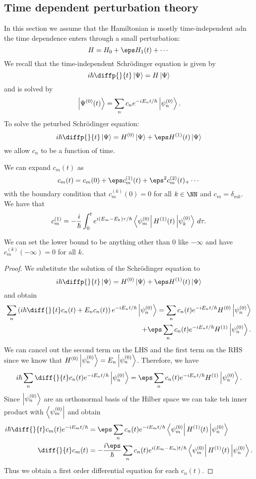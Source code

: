 \documentclass[12pt, a4paper]{article}
\begin{document}
\subsection{Time dependent perturbation theory}

In this section we assume that the Hamiltonian is mostly time-independent adn the time dependence enters through a small perturbation:
\[H=H_0 +\eps H_1(t)+\cdots\]
We recall that the time-independent Schrödinger equation is given by 
\[i\hbar \diffp{}{t}\ket{\Psi} = H\ket{\Psi}\]
and is solved by 
\[\ket{\Psi^{(0)}(t)} = \sum_n c_n e^{-i E_n t/\hbar} \ket{\psi_n^{(0)}}.\]
To solve the peturbed Schrödinger equation:
\[i\hbar \diffp{}{t} \ket{\Psi} = H^{(0)} \ket{\Psi} +\eps H^{(1)}(t)\ket{\Psi}\]
we allow \(c_n\) to be a function of time.

\begin{mdprop}
    We can expand \(c_m(t)\) as 
    \[c_m(t) = c_m(0)+\eps c_m^{(1)}(t) +\eps^2 c_m^{(2)}(t) _
    +\cdots\]
    with the boundary condition that \(c_m^{(k)}(0)=0\) for all \(k \in \NN\) and \(c_m = \delta_{mk}\). We have that 
    \[c_m^{(1)} = -\frac{i}{\hbar} \int_0^t e^{i(E_m-E_k)\tau/\hbar} \bra{\psi_m^{(0)}} H^{(1)}(t) \ket{\psi_k^{(0)}} \, d\tau.\]
\end{mdprop}

\begin{mdnote}
    We can set the lower bound to be anything other than \(0\) like \(-\infty\) and have \(c_m^{(k)}(-\infty)=0\) for all \(k\). 
\end{mdnote}

\begin{proof}
    We substitute the solution of the Schrödinger equation to 
    \[i\hbar \diffp{}{t} \ket{\Psi} = H^{(0)} \ket{\Psi} +\eps H^{(1)}(t)\ket{\Psi}\]
    and obtain 
    \[\begin{split}
        \sum_n \left( i\hbar \diff{}{t}c_n(t)+E_n c_n(t) \right) e^{-i E_n t/\hbar} \ket{\psi_n^{(0)}} =\sum_n c_n(t) e^{-i E_n t/\hbar} H^{(0)}\ket{\psi_n^{(0)}} \\
        +\eps \sum_n c_n(t)e^{-i E_n t/\hbar} H^{(1)} \ket{\psi_n^{(0)}}.
    \end{split}\]
    We can cancel out the second term on the LHS and the first term on the RHS since we know that \(H^{(0)}\ket{\psi_n^{(0)}} =E_n \ket{\psi_n^{(0)}}\). Therefore, we have 
    \[i\hbar \sum_n \diff{}{t}c_n(t) e^{-i E_n t/\hbar} \ket{\psi_n^{(0)}} = \eps\sum_n c_n(t) e^{-i E_n t/\hbar} H^{(1)} \ket{\psi_n^{(0)}}.\]
    Since \(\ket{\psi_n^{(0)}}\) are an orthonormal basis of the Hilber space we can take teh inner product with \(\bra{\psi_m^{(0)}}\) and obtain 
    \[\begin{aligned}
        i\hbar \diff{}{t}c_m(t) e^{-iE_m t/\hbar} &= \eps \sum_n c_n(t) e^{-iE_m t/\hbar} \bra{\psi_m^{(0)}} H^{(1)}(t) \ket{\psi_n^{(0)}} \\
        \diff{}{t}c_m(t) &= -\frac{i\eps}{\hbar} \sum_n c_n(t) e^{i(E_m-E_n)t/\hbar} \bra{\psi_m^{(0)}} H^{(1)}(t) \ket{\psi_n^{(0)}}.
    \end{aligned}\]
    Thus we obtain a first order differential equation for each \(c_n(t)\). 
\end{proof}
\end{document}
